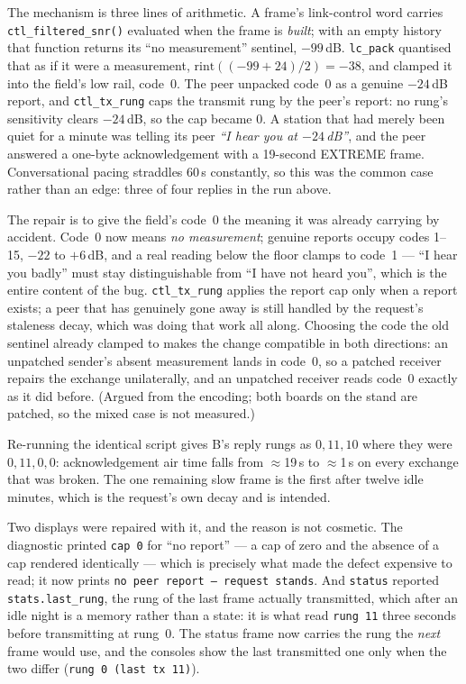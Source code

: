 The mechanism is three lines of arithmetic.  A frame's link-control
word carries \texttt{ctl\_filtered\_snr()} evaluated when the frame is
\emph{built}; with an empty history that function returns its
``no measurement'' sentinel, $-99$\,dB.  \texttt{lc\_pack} quantised
that as if it were a measurement, $\mathrm{rint}((-99+24)/2) = -38$,
and clamped it into the field's low rail, code~0.  The peer unpacked
code~0 as a genuine $-24$\,dB report, and \texttt{ctl\_tx\_rung} caps
the transmit rung by the peer's report: no rung's sensitivity clears
$-24$\,dB, so the cap became 0.  A station that had merely been quiet
for a minute was telling its peer \emph{``I hear you at $-24$\,dB''},
and the peer answered a one-byte acknowledgement with a 19-second
EXTREME frame.  Conversational pacing straddles 60\,s constantly, so
this was the common case rather than an edge: three of four replies in
the run above.

The repair is to give the field's code~0 the meaning it was already
carrying by accident.  Code~0 now means \emph{no measurement};
genuine reports occupy codes 1--15, $-22$ to $+6$\,dB, and a real
reading below the floor clamps to code~1 --- ``I hear you badly'' must
stay distinguishable from ``I have not heard you'', which is the entire
content of the bug.  \texttt{ctl\_tx\_rung} applies the report cap only
when a report exists; a peer that has genuinely gone away is still
handled by the request's staleness decay, which was doing that work all
along.  Choosing the code the old sentinel already clamped to makes the
change compatible in both directions: an unpatched sender's absent
measurement lands in code~0, so a patched receiver repairs the exchange
unilaterally, and an unpatched receiver reads code~0 exactly as it did
before.  (Argued from the encoding; both boards on the stand are
patched, so the mixed case is not measured.)

Re-running the identical script gives B's reply rungs as
$0, 11, 10$ where they were $0, 11, 0, 0$: acknowledgement air time
falls from $\approx$19\,s to $\approx$1\,s on every exchange that was
broken.  The one remaining slow frame is the first after twelve idle
minutes, which is the request's own decay and is intended.

Two displays were repaired with it, and the reason is not cosmetic.
The diagnostic printed \texttt{cap 0} for ``no report'' --- a cap of
zero and the absence of a cap rendered identically --- which is
precisely what made the defect expensive to read; it now prints
\texttt{no peer report -- request stands}.  And \texttt{status}
reported \texttt{stats.last\_rung}, the rung of the last frame actually
transmitted, which after an idle night is a memory rather than a state:
it is what read \texttt{rung 11} three seconds before transmitting at
rung~0.  The status frame now carries the rung the \emph{next} frame
would use, and the consoles show the last transmitted one only when the
two differ (\texttt{rung 0 (last tx 11)}).

